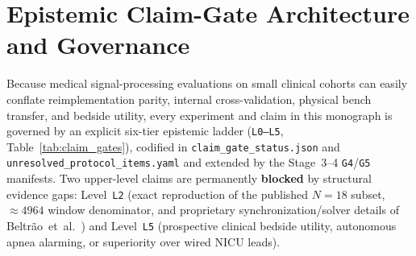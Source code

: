 \section{Epistemic Claim-Gate Architecture and Governance}
\label{sec:ch1_gates}

Because medical signal-processing evaluations on small clinical cohorts can easily conflate
reimplementation parity, internal cross-validation, physical bench transfer, and bedside utility,
every experiment and claim in this monograph is governed by an explicit six-tier epistemic ladder
(\texttt{L0--L5}, Table~\ref{tab:claim_gates}), codified in
\texttt{claim\_\allowbreak gate\_\allowbreak status.\allowbreak json} and
\texttt{unresolved\_\allowbreak protocol\_\allowbreak items.\allowbreak yaml} and extended by
the Stage~3--4 \texttt{G4}/\texttt{G5} manifests. Two upper-level
claims are permanently
\textbf{blocked} by structural evidence gaps: Level~\texttt{L2} (exact reproduction of the
published $N=18$ subset, $\approx 4964$ window denominator, and proprietary synchronization/solver
details of Beltr\~ao~et~al.\ \citep{beltrao2022contactless}) and Level~\texttt{L5} (prospective clinical
bedside utility, autonomous apnea alarming, or superiority over wired NICU leads).

